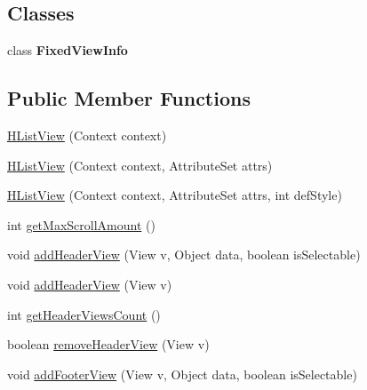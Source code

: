 \subsection*{Classes}
\begin{DoxyCompactItemize}
\item 
class {\bfseries Fixed\+View\+Info}
\end{DoxyCompactItemize}
\subsection*{Public Member Functions}
\begin{DoxyCompactItemize}
\item 
\hyperlink{classit_1_1sephiroth_1_1android_1_1library_1_1widget_1_1_h_list_view_a2360ad04939c1cea605001191eab9c2c}{H\+List\+View} (Context context)
\item 
\hyperlink{classit_1_1sephiroth_1_1android_1_1library_1_1widget_1_1_h_list_view_afb5b48d4f924286c9faf1c7ad0c86a56}{H\+List\+View} (Context context, Attribute\+Set attrs)
\item 
\hyperlink{classit_1_1sephiroth_1_1android_1_1library_1_1widget_1_1_h_list_view_a5eedadee92f6b81e2e7277a27619f55c}{H\+List\+View} (Context context, Attribute\+Set attrs, int def\+Style)
\item 
int \hyperlink{classit_1_1sephiroth_1_1android_1_1library_1_1widget_1_1_h_list_view_aa2bfd332f30c3b25f3ff512950e9d40c}{get\+Max\+Scroll\+Amount} ()
\item 
void \hyperlink{classit_1_1sephiroth_1_1android_1_1library_1_1widget_1_1_h_list_view_aecc0066eda50ae16e9a48114dc71eb3e}{add\+Header\+View} (View v, Object data, boolean is\+Selectable)
\item 
void \hyperlink{classit_1_1sephiroth_1_1android_1_1library_1_1widget_1_1_h_list_view_a6d2a91669f9f7da20416cbe867222bc9}{add\+Header\+View} (View v)
\item 
int \hyperlink{classit_1_1sephiroth_1_1android_1_1library_1_1widget_1_1_h_list_view_aa0a7edf77aaa9a59de842d382e460637}{get\+Header\+Views\+Count} ()
\item 
boolean \hyperlink{classit_1_1sephiroth_1_1android_1_1library_1_1widget_1_1_h_list_view_a5f5d61678941236846012ee4032c1626}{remove\+Header\+View} (View v)
\item 
void \hyperlink{classit_1_1sephiroth_1_1android_1_1library_1_1widget_1_1_h_list_view_a6f72feb2fb75c3a2f45e41645cbc9078}{add\+Footer\+View} (View v, Object data, boolean is\+Selectable)
\item 

\end{DoxyCompactItemize}
